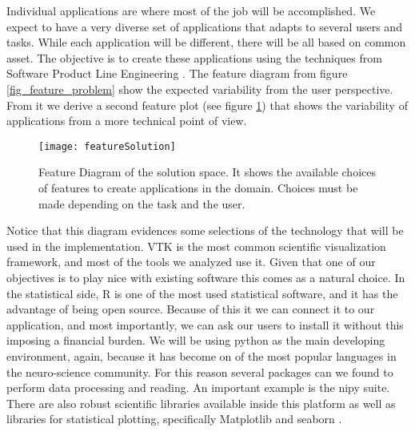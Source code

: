 Individual applications are where most of the job will be accomplished. We expect to have a very diverse set of applications that adapts to several users and tasks. While each application will be different, there will be all based on common asset. The objective is to create these applications using the techniques from Software Product Line Engineering \autocite{pohl_software_2005}. The feature diagram from figure \ref{fig_feature_problem} show the expected variability from the user perspective. From it we derive a second feature plot (see figure \ref{fig_feature_solution}) that shows the variability of applications from a more technical point of view.  

\begin{figure}
\centering
\texttt{[image: featureSolution]}
\caption{\label{fig_feature_solution}Feature Diagram of the solution space. It shows the available choices of features to create applications in the domain. Choices must be made depending on the task and the user.}
\end{figure}

Notice that this diagram evidences some selections of the technology that will be used in the implementation. VTK \autocite{schroeder_vtk_1998} is the most common scientific visualization framework, and most of the tools we analyzed use it. Given that one of our objectives is to play nice with existing software this comes as a natural choice. In the statistical side, R \autocite{team_r:_2012} is one of the most used statistical software, and it has the advantage of being open source. Because of this it we can connect it to our application, and most importantly, we can ask our users to install it without this imposing a financial burden. We will be using python as the main developing environment, again, because it has become on of the most popular languages in the neuro-science  community. For this reason several packages can we found to perform data processing and reading. An important example is the nipy \autocite{gorgolewski_nipype:_2011-1} suite. There are also robust scientific libraries \autocite{van_der_walt_numpy_2011, jones_scipy:_2001,mckinney_data_2010} available inside this platform as well as libraries for statistical plotting, specifically Matplotlib \autocite{hunter_matplotlib:_2007} and seaborn \autocite{michael_waskom_seaborn:_2015}.

